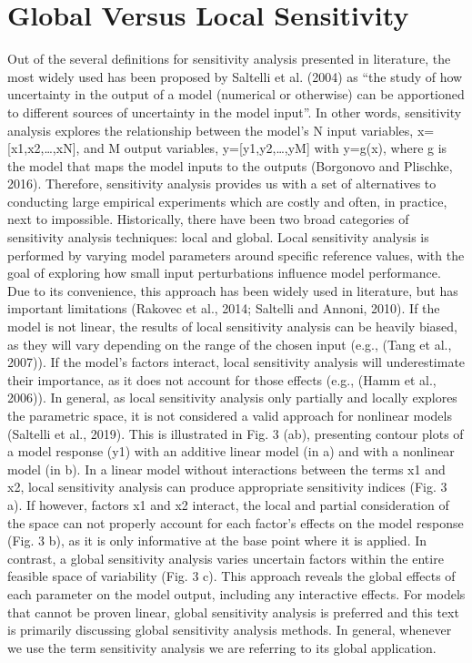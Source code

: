 \documentclass[letterpaper,10pt,english]{sphinxmanual}
\begin{document}
\section{Global Versus Local Sensitivity}
\label{\detokenize{3_sensitivity_analysis_the_basics:global-versus-local-sensitivity}}
\sphinxAtStartPar
Out of the several definitions for sensitivity analysis presented in literature, the most widely used has been proposed by Saltelli et al. (2004) as “the study of how uncertainty in the output of a model (numerical or otherwise) can be apportioned to different sources of uncertainty in the model input”. In other words, sensitivity analysis explores the relationship between the model’s N input variables, x={[}x1,x2,…,xN{]}, and M output variables, y={[}y1,y2,…,yM{]} with y=g(x), where g is the model that maps the model inputs to the outputs (Borgonovo and Plischke, 2016). Therefore, sensitivity analysis provides us with a set of alternatives to conducting large empirical experiments which are costly and often, in practice, next to impossible.
Historically, there have been two broad categories of sensitivity analysis techniques: local and global. Local sensitivity analysis is performed by varying model parameters around specific reference values, with the goal of exploring how small input perturbations influence model performance. Due to its convenience, this approach has been widely used in literature, but has important limitations (Rakovec et al., 2014; Saltelli and Annoni, 2010). If the model is not linear, the results of local sensitivity analysis can be heavily biased, as they will vary depending on the range of the chosen input (e.g., (Tang et al., 2007)). If the model’s factors interact, local sensitivity analysis will underestimate their importance, as it does not account for those effects (e.g., (Hamm et al., 2006)). In general, as local sensitivity analysis only partially and locally explores the parametric space, it is not considered a valid approach for nonlinear models (Saltelli et al., 2019). This is illustrated in Fig. 3 (a\sphinxhyphen{}b), presenting contour plots of a model response (y1) with an additive linear model (in a) and with a nonlinear model (in b). In a linear model without interactions between the terms x1 and x2, local sensitivity analysis can produce appropriate sensitivity indices (Fig. 3 a). If however, factors x1 and x2 interact, the local and partial consideration of the space can not properly account for each factor’s effects on the model response (Fig. 3 b), as it is only informative at the base point where it is applied. In contrast, a global sensitivity analysis varies uncertain factors within the entire feasible space of variability (Fig. 3 c). This approach reveals the global effects of each parameter on the model output, including any interactive effects. For models that cannot be proven linear, global sensitivity analysis is preferred and this text is primarily discussing global sensitivity analysis methods. In general, whenever we use the term sensitivity analysis we are referring to its global application.
\end{document}
